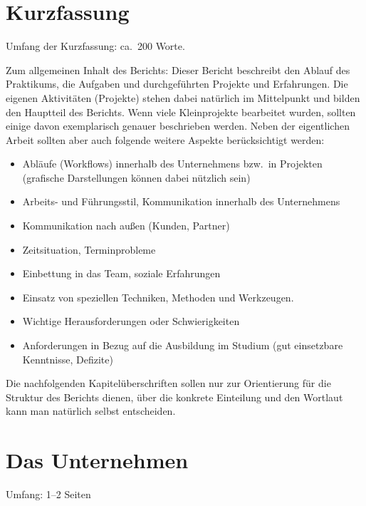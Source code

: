 \documentclass[praktikum,german]{hgbthesis}
\author{Peter A.\ Schlaumeier}
\begin{document}
\frontmatter
\maketitle
\tableofcontents

\chapter{Kurzfassung}
Umfang der Kurzfassung: ca.\ 200 Worte.

Zum allgemeinen Inhalt des Berichts: Dieser Bericht beschreibt den Ablauf des Praktikums, die Aufgaben und durchgeführten Projekte und Erfahrungen. Die eigenen Aktivitäten (Projekte) stehen dabei natürlich im Mittelpunkt und bilden den Hauptteil des Berichts. Wenn viele Kleinprojekte bearbeitet wurden, sollten einige davon exemplarisch
genauer beschrieben werden. Neben der eigentlichen Arbeit sollten aber auch folgende weitere Aspekte berücksichtigt werden:
%
\begin{itemize}
\item Abläufe (Workflows) innerhalb des Unternehmens bzw.\ in Projekten (grafische Darstellungen
können dabei nützlich sein)
\item Arbeits- und Führungsstil, Kommunikation innerhalb des Unternehmens
\item Kommunikation nach außen (Kunden, Partner)
\item Zeitsituation, Terminprobleme
\item Einbettung in das Team, soziale Erfahrungen
\item Einsatz von speziellen Techniken, Methoden und Werkzeugen.
\item Wichtige Herausforderungen oder Schwierigkeiten
\item Anforderungen in Bezug auf die Ausbildung im Studium (gut einsetzbare Kenntnisse, Defizite)
\end{itemize}
%
Die nachfolgenden Kapitelüberschriften sollen nur zur Orientierung für die Struktur des Berichts dienen, über die konkrete Einteilung und den Wortlaut kann man natürlich selbst entscheiden.

\mainmatter           %

\chapter{Das Unternehmen}
Umfang: 1--2 Seiten
\end{document}
